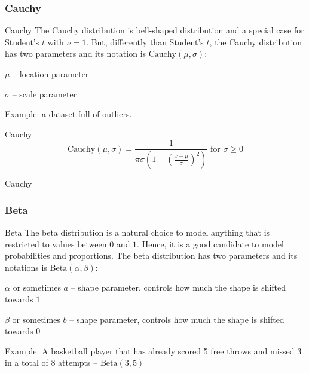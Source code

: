 \subsubsection*{Cauchy}
\begin{frame}[noframenumbering]{Cauchy}
	The Cauchy distribution is bell-shaped distribution and a special case for Student's $t$ with $\nu=1$.
	\vfill
	But, differently than Student's $t$, the Cauchy distribution has two parameters and its notation is
	$\text{Cauchy}( \mu , \sigma)$:
	\begin{vfilleditems}
		\item $\mu$ -- location parameter
		\item $\sigma$ -- scale parameter
	\end{vfilleditems}
	\vfill
	Example: a dataset full of outliers.
\end{frame}

\begin{frame}[noframenumbering]{Cauchy}
	$$\text{Cauchy}(\mu, \sigma) = \frac{1}{\pi \sigma \left(1 + \left(\frac{x - \mu}{\sigma} \right)^2 \right)} \text{ for $\sigma \geq 0$}$$
\end{frame}

\begin{frame}[noframenumbering]{Cauchy}
	\centering
\end{frame}

\subsubsection*{Beta}
\begin{frame}[noframenumbering]{Beta}
	The beta distribution is a natural choice to model anything that is
	restricted to values between $0$ and $1$.
	Hence, it is a good candidate to model probabilities and proportions.
	\vfill
	The beta distribution has two parameters and its notations is
	$\text{Beta} (\alpha, \beta)$:
	\begin{vfilleditems}
		\item $\alpha$ or sometimes $a$ -- shape parameter,
		controls how much the shape is shifted towards $1$
		\item $\beta$ or sometimes $b$ -- shape parameter,
		controls how much the shape is shifted towards $0$
	\end{vfilleditems}
	\vfill
	Example: A basketball player that has already scored 5 free throws and
	missed 3 in a total of 8 attempts -- $\text{Beta}(3, 5)$
\end{frame}

